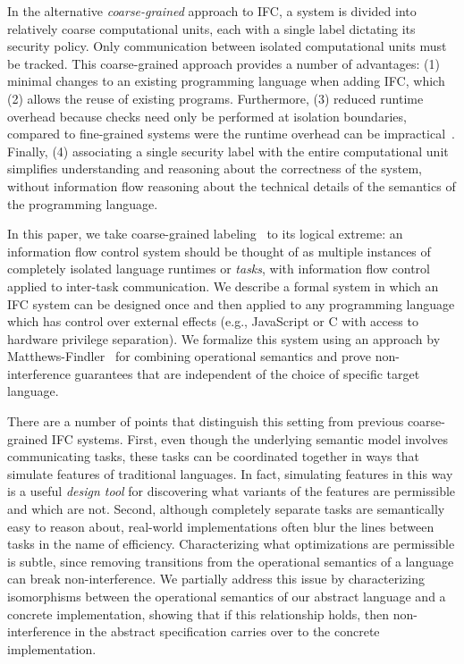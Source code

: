 In the alternative \textit{coarse-grained} approach to IFC,
a system is divided into relatively coarse computational units,
each with a single label dictating its security policy.
Only
communication between isolated computational units must be tracked.
This coarse-grained approach provides a number of advantages:
(1) minimal changes to an
existing programming language when adding IFC, which (2) allows
the reuse of existing programs.  Furthermore, (3)
reduced runtime overhead because checks need only
be performed at isolation boundaries, compared to fine-grained
systems were the runtime overhead can be impractical~\cite{JSFlow}.
Finally, (4) associating
a single security label with the entire computational unit simplifies
understanding and reasoning about the correctness of the
system, without information flow reasoning about the
technical details of the semantics of the programming language.

In this paper, we take coarse-grained labeling~\cite{Zeldovich:2006,
lio} to its logical extreme: an information flow control system should
be thought of as multiple instances of completely isolated language
runtimes or \emph{tasks}, with information flow control applied to
inter-task communication.  We describe a formal system in which an IFC
system can be designed once and then applied to any programming language
which has control over external effects (e.g., JavaScript or C with
access to hardware privilege separation).  We formalize this system
using an approach by
Matthews-Findler~\cite{Matthews:2007:OSM:1190216.1190220} for combining
operational semantics and prove non-interference guarantees
that are independent of the choice of specific target language.

There are a number of points that distinguish this setting from
previous coarse-grained IFC systems.
%
First, even though the underlying semantic model involves communicating
tasks, these tasks can be coordinated together in ways that simulate
features of traditional languages.
%
In fact, simulating
features in this way is a useful \emph{design tool} for discovering
what variants of the features are permissible and which are not.
%
Second, although completely separate tasks are semantically easy to
reason about, real-world implementations often blur the lines between
tasks in the name of efficiency.
Characterizing what optimizations are permissible is subtle, since
removing transitions from the operational semantics of a language can
break non-interference.  We partially address this issue
by characterizing isomorphisms between the operational semantics of our
abstract language and a concrete implementation, showing that if this
relationship holds, then non-interference in the abstract specification
carries over to the concrete implementation.

